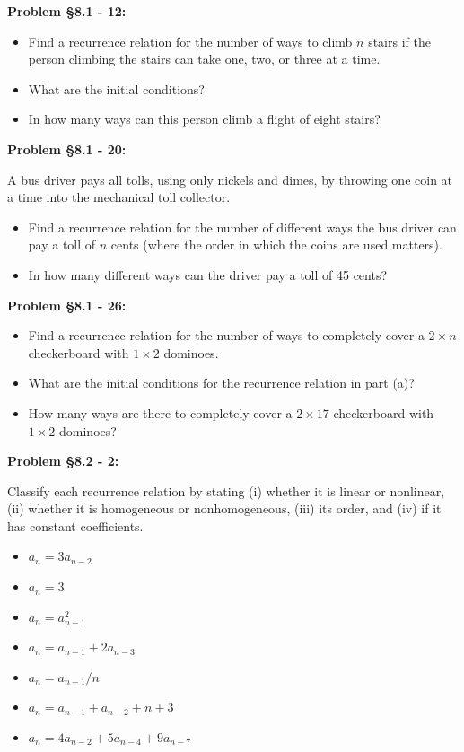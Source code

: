 \documentclass{article}
\newenvironment{problem}[1]
    {\begin{mdframed}[default]
    \textbf{Problem #1:}
    }
    {\end{mdframed}
    }
\begin{document}
\begin{problem}{\S 8.1 - 12}
\begin{itemize}
    \item[(a)] Find a recurrence relation for the number of ways to climb $n$ stairs if the person climbing the stairs can take one, two, or three at a time.
    \item[(b)] What are the initial conditions?
    \item[(c)] In how many ways can this person climb a flight of eight stairs?
\end{itemize}
\end{problem}


\begin{problem}{\S 8.1 - 20}
A bus driver pays all tolls, using only nickels and dimes, by throwing one coin at a time into the mechanical toll collector.
\begin{itemize}
    \item[(a)] Find a recurrence relation for the number of different ways the bus driver can pay a toll of $n$ cents (where the order in which the coins are used matters).
    \item[(b)] In how many different ways can the driver pay a toll of 45 cents?
\end{itemize}
\end{problem}


\begin{problem}{\S 8.1 - 26}
\begin{itemize}
    \item[(a)] Find a recurrence relation for the number of ways to completely cover a $2 \times n$ checkerboard with $1 \times 2$ dominoes.
    \item[(b)] What are the initial conditions for the recurrence relation in part (a)?
    \item[(c)] How many ways are there to completely cover a $2 \times 17$ checkerboard with $1 \times 2$ dominoes?
\end{itemize}
\end{problem}


\begin{problem}{\S 8.2 - 2}
Classify each recurrence relation by stating (i) whether it is linear or nonlinear, (ii) whether it is homogeneous or nonhomogeneous, (iii) its order, and (iv) if it has constant coefficients.
\begin{itemize}
    \item[(a)] $a_n = 3a_{n-2}$
    \item[(b)] $a_n = 3$
    \item[(c)] $a_n = a_{n-1}^2$
    \item[(d)] $a_n = a_{n-1} + 2a_{n-3}$
    \item[(e)] $a_n = a_{n-1}/n$
    \item[(f)] $a_n = a_{n-1} + a_{n-2} + n + 3$
    \item[(g)] $a_n = 4a_{n-2} + 5a_{n-4} + 9a_{n-7}$
\end{itemize}
\end{problem}
\end{document}
